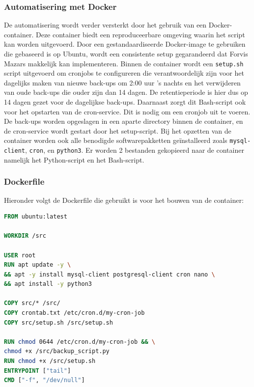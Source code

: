 \subsubsection{Automatisering met Docker}
De automatisering wordt verder versterkt door het gebruik van een Docker-container. Deze container biedt een reproduceerbare omgeving waarin het script kan worden uitgevoerd. Door een gestandaardiseerde Docker-image te gebruiken die gebaseerd is op Ubuntu, wordt een consistente setup gegarandeerd dat Forvis Mazars makkelijk kan implementeren. Binnen de container wordt een \texttt{setup.sh} script uitgevoerd om cronjobs te configureren die verantwoordelijk zijn voor het dagelijks maken van nieuwe back-ups om 2:00 uur 's nachts en het verwijderen van oude back-ups die ouder zijn dan 14 dagen. De retentieperiode is hier dus op 14 dagen gezet voor de dagelijkse back-ups. Daarnaast zorgt dit Bash-script ook voor het opstarten van de cron-service. Dit is nodig om een cronjob uit te voeren. De back-ups worden opgeslagen in een aparte directory binnen de container, en de cron-service wordt gestart door het setup-script. Bij het opzetten van de container  worden ook alle benodigde softwarepakketten geïnstalleerd zoals \texttt{mysql-client}, \texttt{cron}, en \texttt{python3}. Er worden 2 bestanden gekopieerd naar de container namelijk het Python-script en het Bash-script.

\subsubsection{Dockerfile}
Hieronder volgt de Dockerfile die gebruikt is voor het bouwen van de container:
\begin{lstlisting}[language=Dockerfile, caption=Dockerfile voor de back-upcontainer]
FROM ubuntu:latest

WORKDIR /src

USER root
RUN apt update -y \
&& apt -y install mysql-client postgresql-client cron nano \
&& apt install -y python3

COPY src/* /src/
COPY crontab.txt /etc/cron.d/my-cron-job
COPY src/setup.sh /src/setup.sh

RUN chmod 0644 /etc/cron.d/my-cron-job && \
chmod +x /src/backup_script.py 
RUN chmod +x /src/setup.sh
ENTRYPOINT ["tail"]
CMD ["-f", "/dev/null"]
\end{lstlisting}


